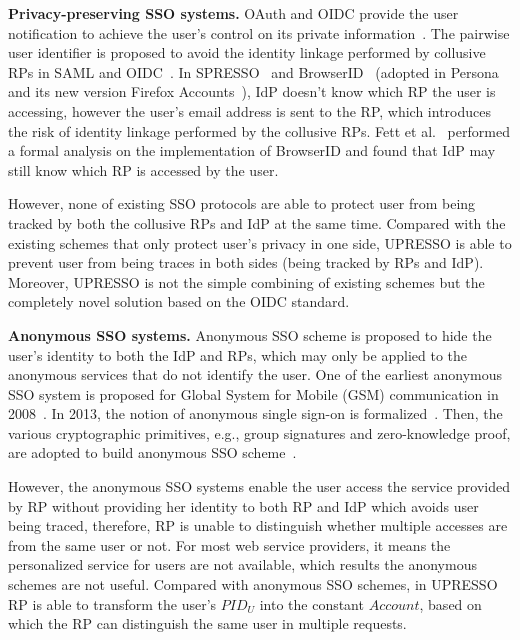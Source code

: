 \noindent\textbf{Privacy-preserving SSO systems.} OAuth and OIDC provide the user notification to achieve the user's control on its private information~\cite{ChenPCTKT14,YangLLZH16}.
The pairwise user identifier is proposed to avoid the identity linkage performed by collusive RPs in SAML and OIDC~\cite{OpenIDConnect,SAML}.
In SPRESSO~\cite{SPRESSO} and BrowserID~\cite{BrowserID} (adopted in Persona~\cite{persona} and its new version Firefox Accounts~\cite{FirefoxAccount}), IdP doesn't know which RP the user is accessing, however the user's email address is sent to the RP, which introduces the risk of identity linkage performed by the collusive RPs. Fett et al.~\cite{FettKS14, BrowserID} performed a formal analysis on the implementation of BrowserID and found that IdP may still know which RP is accessed by the user.

However, none of existing SSO protocols are able to protect user from being tracked by both the collusive RPs and IdP at the same time.
Compared with the existing schemes that only protect user's privacy in one side, UPRESSO is able to prevent user from being traces in both sides (being tracked by RPs and IdP). Moreover, UPRESSO is not the simple combining of existing schemes but the completely novel solution based on the OIDC standard.

\noindent\textbf{Anonymous SSO systems.} Anonymous SSO scheme is proposed to hide the user's identity to both the IdP and RPs, which may only be applied to the anonymous services that do not identify the user.
One of the earliest anonymous SSO system is proposed for Global System for Mobile (GSM) communication in 2008~\cite{ElmuftiWRR08}.
In 2013, the notion of anonymous single sign-on is formalized~\cite{WangWS13}.
Then, the various cryptographic primitives, e.g., group signatures and zero-knowledge proof, are adopted to build anonymous SSO scheme~\cite{WangWS13,HanCSTW18}.

However, the anonymous SSO systems enable the user access the service provided by RP without providing her identity to both RP and IdP which avoids user being traced, therefore, RP is unable to distinguish whether multiple accesses are from the same user or not. For most web service providers, it means the personalized service for users are not available, which results the anonymous schemes are not useful. Compared with anonymous SSO schemes, in UPRESSO RP is able to transform the user's $PID_U$ into the constant $Account$, based on which the RP can distinguish the same user in multiple requests. 
